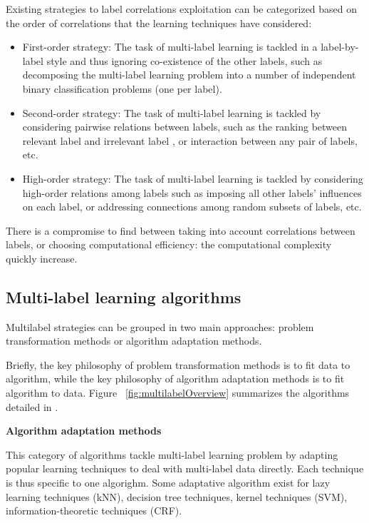 Existing strategies to label correlations exploitation can be categorized based on the order of correlations that the learning techniques have considered:
\begin{itemize}
	\item First-order strategy: The task of multi-label learning is tackled in a label-by-label style and thus ignoring co-existence of the other labels, such as decomposing the multi-label learning problem into a number of independent binary classification problems (one per label). 
	\item Second-order strategy: The task of multi-label learning is tackled by considering pairwise relations between labels, such as the ranking between relevant label and irrelevant label , or interaction between any pair of labels, etc.
	\item High-order strategy: The task of multi-label learning is tackled by considering high-order relations among labels such as imposing all other labels’ influences on each label, or addressing connections among random subsets of labels, etc.
\end{itemize}

There is a compromise to find between taking into account correlations between labels, or choosing computational efficiency: the computational complexity quickly increase.

\subsection{Multi-label learning algorithms}

Multilabel strategies can be grouped in two main approaches: problem transformation methods or algorithm adaptation methods.

Briefly, the key philosophy of problem transformation methods is to fit data to algorithm,
while the key philosophy of algorithm adaptation methods is to fit algorithm to data. Figure ~\ref{fig:multilabelOverview}
summarizes the algorithms detailed in \cite[Zhang and Zhou paper]{MultilabelReview}.

\textbf{Algorithm adaptation methods}

This category of algorithms tackle multi-label learning problem by adapting popular learning techniques to deal with multi-label data directly. Each technique is thus specific to one algorighm.
Some adaptative algorithm exist for lazy learning techniques (kNN), decision tree techniques, kernel techniques (SVM), information-theoretic techniques (CRF).

